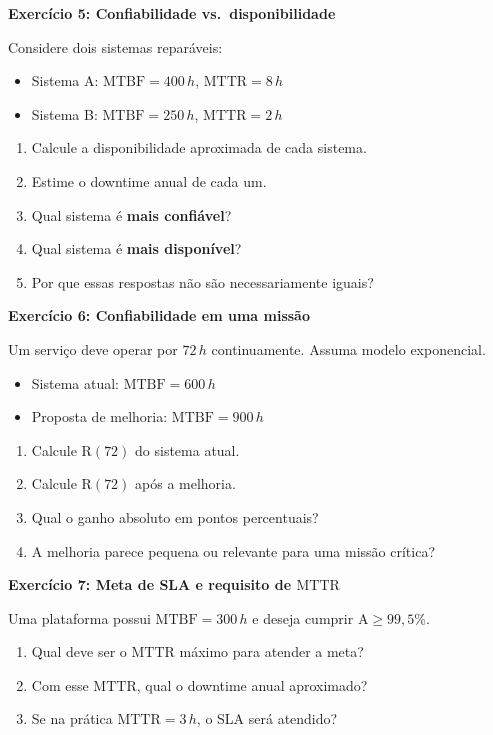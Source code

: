 \documentclass[10pt,a4paper]{article}
\newcommand{\R}{\mathrm{R}}
\newcommand{\A}{\mathrm{A}}
\newcommand{\MTBF}{\mathrm{MTBF}}
\newcommand{\MTTR}{\mathrm{MTTR}}
\begin{document}
\textbf{Exercício 5: Confiabilidade vs.\ disponibilidade}

Considere dois sistemas reparáveis:
\begin{itemize}
  \item Sistema A: \(\MTBF=400\,h\), \(\MTTR=8\,h\)
  \item Sistema B: \(\MTBF=250\,h\), \(\MTTR=2\,h\)
\end{itemize}
\begin{enumerate}
  \item Calcule a disponibilidade aproximada de cada sistema.
  \item Estime o downtime anual de cada um.
  \item Qual sistema é \textbf{mais confiável}?
  \item Qual sistema é \textbf{mais disponível}?
  \item Por que essas respostas não são necessariamente iguais?
\end{enumerate}

\vspace{6pt}

\textbf{Exercício 6: Confiabilidade em uma missão}

Um serviço deve operar por \(72\,h\) continuamente. Assuma modelo exponencial.
\begin{itemize}
  \item Sistema atual: \(\MTBF=600\,h\)
  \item Proposta de melhoria: \(\MTBF=900\,h\)
\end{itemize}
\begin{enumerate}
  \item Calcule \(\R(72)\) do sistema atual.
  \item Calcule \(\R(72)\) após a melhoria.
  \item Qual o ganho absoluto em pontos percentuais?
  \item A melhoria parece pequena ou relevante para uma missão crítica?
\end{enumerate}

\vspace{6pt}

\textbf{Exercício 7: Meta de SLA e requisito de \(\MTTR\)}

Uma plataforma possui \(\MTBF=300\,h\) e deseja cumprir \(\A \ge 99{,}5\%\).
\begin{enumerate}
  \item Qual deve ser o \(\MTTR\) máximo para atender a meta?
  \item Com esse \(\MTTR\), qual o downtime anual aproximado?
  \item Se na prática \(\MTTR=3\,h\), o SLA será atendido?
\end{enumerate}
\end{document}
